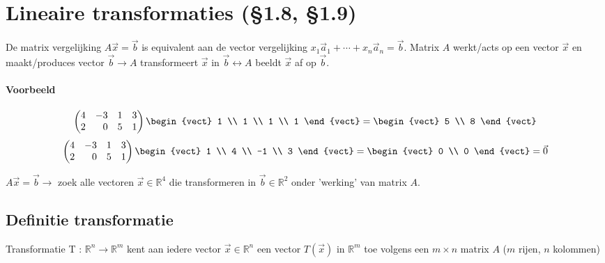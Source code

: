 \section{Lineaire transformaties (\S 1.8, \S 1.9)}
De matrix vergelijking $A \vec{x} = \vec{b}$ is equivalent aan de vector vergelijking $x_1 \vec{a}_1 + \cdots + x_n \vec{a}_n = \vec{b}$. Matrix $A$ werkt/acts op een vector $\vec{x}$ en maakt/produces vector $\vec{b} \to A$ transformeert $\vec{x}$ in $\vec{b} \leftrightarrow A$  beeldt $\vec{x}$ af op $\vec{b}$.

\paragraph{Voorbeeld}
\[ \begin{pmatrix*}[r]
	4 & -3 & 1 & 3 \\
	2 & 0 & 5 & 1
\end{pmatrix*} \begin{vect} 1 \\ 1 \\ 1 \\ 1 \end{vect} = \begin{vect} 5 \\ 8 \end{vect} \]
\[ \begin{pmatrix*}[r]
	4 & -3 & 1 & 3 \\
	2 & 0 & 5 & 1
\end{pmatrix*} \begin{vect} 1 \\ 4 \\ -1 \\ 3 \end{vect} = \begin{vect} 0 \\ 0 \end{vect} = \vec{0} \]

$A \vec{x} = \vec{b} \to$ zoek alle vectoren $\vec{x} \in \mathbb{R}^4$ die transformeren in $\vec{b} \in \mathbb{R}^2$ onder 'werking' van matrix $A$.

\subsection{Definitie transformatie}
Transformatie T : $\mathbb{R}^n \to \mathbb{R}^m$ kent aan iedere vector $\vec{x} \in \mathbb{R}^n$ een vector $T(\vec{x})$ in $\mathbb{R}^m$ toe volgens een $m \times n$ matrix $A$ ($m$ rijen, $n$ kolommen)

